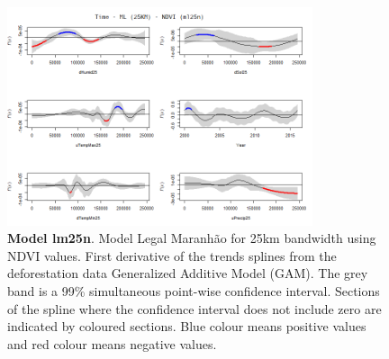 \begin{table}

\begin{figure}[H]
 \centering
        \centering
        \includegraphics[width=0.8\textwidth]{ml25n.png} %
        \caption[Model Legal Maranhão for 25km bandwidth using NDVI values. First derivative of the trends splines from the deforestation data Generalized Additive Model (GAM)]{\textbf{Model lm25n}. Model Legal Maranhão for 25km bandwidth using NDVI values. First derivative of the trends splines from the deforestation data Generalized Additive Model (GAM). The grey band is a 99\% simultaneous point-wise confidence interval. Sections of the spline where the confidence interval does not include zero are indicated by coloured sections. Blue colour means positive values and red colour means negative values.}
        \centering
\end{figure}
\end{table}

